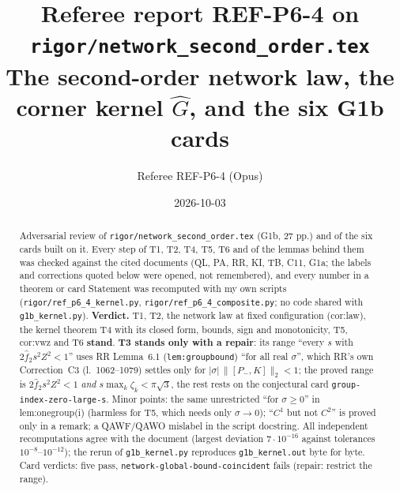 \documentclass[11pt]{article}
\title{\color{navy}\bfseries Referee report REF-P6-4 on \texttt{rigor/network\_second\_order.tex}\\[0.3em]
\large The second-order network law, the corner kernel $\hat G$, and the six G1b cards}
\author{Referee REF-P6-4 (Opus)}\date{2026-10-03}
\newcommand{\norm}[1]{\lVert#1\rVert}\newcommand{\abs}[1]{\lvert#1\rvert}\newcommand{\Gh}{\widehat G}
\begin{document}
\maketitle

\begin{abstract}\noindent
Adversarial review of \texttt{rigor/network\_second\_order.tex} (G1b, 27 pp.) and of the six cards built on it.
Every step of T1, T2, T4, T5, T6 and of the lemmas behind them was checked against the cited documents (QL, PA, RR,
KI, TB, C11, G1a; the labels and corrections quoted below were opened, not remembered), and every number in a
theorem or card Statement was recomputed with my own scripts (\texttt{rigor/ref\_p6\_4\_kernel.py},
\texttt{rigor/ref\_p6\_4\_composite.py}; no code shared with \texttt{g1b\_kernel.py}).
\textbf{Verdict.} T1, T2, the network law at fixed configuration (cor:law), the kernel theorem T4 with its closed
form, bounds, sign and monotonicity, T5, cor:vwz and T6 \textbf{stand}.  \textbf{T3 stands only with a repair}: its
range ``every $s$ with $2\hat f_2s^2Z^2<1$'' uses RR Lemma~6.1 (\texttt{lem:groupbound}) ``for all real $\sigma$'',
which RR's own Correction~C3 (l.~1062--1079) settles only for $|\sigma|\,\norm{[P_-,K]}_2<1$; the proved range is
$2\hat f_2s^2Z^2<1$ \emph{and} $s\max_k\zeta_k<\pi\sqrt3$, the rest rests on the conjectural card
\texttt{group-index-zero-large-s}.  Minor points: the same unrestricted ``for $\sigma\ge0$'' in lem:onegroup(i)
(harmless for T5, which needs only $\sigma\to0$); ``$C^1$ but not $C^2$'' is proved only in a remark; a QAWF/QAWO
mislabel in the script docstring.  All independent recomputations agree with the document (largest deviation
$7\cdot10^{-16}$ against tolerances $10^{-8}$--$10^{-12}$); the rerun of \texttt{g1b\_kernel.py} reproduces
\texttt{g1b\_kernel.out} byte for byte.  Card verdicts: five pass, \texttt{network-global-bound-coincident} fails
(repair: restrict the range).
\end{abstract}

\tableofcontents
\end{document}
